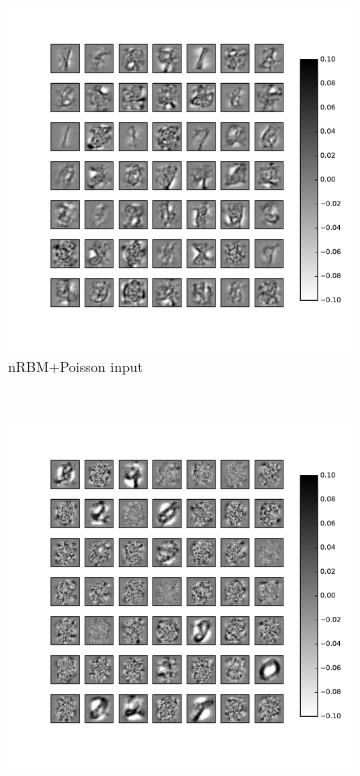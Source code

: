 \begin{figure}
\begin{subfigure}[t]{0.4\textwidth}
		\includegraphics[width=\textwidth]{pics_sdlm/33_MNIST_RBM_noise/2_60000_0.pdf}
		\caption{nRBM+Poisson input}
	\end{subfigure}\\
	\begin{subfigure}[t]{0.4\textwidth}
		\includegraphics[width=\textwidth]{pics_sdlm/50_MNIST_SRBM_original/2_60000_0.pdf}

\end{subfigure}
\end{figure}
